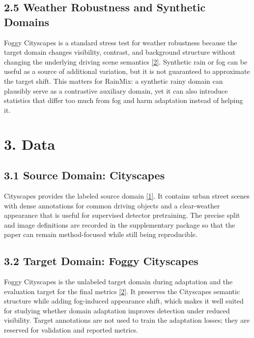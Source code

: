 \documentclass[
  11pt,
]{article}
\begin{document}
\hypertarget{weather-robustness-and-synthetic-domains}{%
\subsection{2.5 Weather Robustness and Synthetic
Domains}\label{weather-robustness-and-synthetic-domains}}

Foggy Cityscapes is a standard stress test for weather robustness
because the target domain changes visibility, contrast, and background
structure without changing the underlying driving scene semantics
\protect\hyperlink{ref-sakaridis2018semanticfoggy}{{[}2{]}}. Synthetic
rain or fog can be useful as a source of additional variation, but it is
not guaranteed to approximate the target shift. This matters for
RainMix: a synthetic rainy domain can plausibly serve as a contrastive
auxiliary domain, yet it can also introduce statistics that differ too
much from fog and harm adaptation instead of helping it.

\hypertarget{data}{%
\section{3. Data}\label{data}}

\hypertarget{source-domain-cityscapes}{%
\subsection{3.1 Source Domain:
Cityscapes}\label{source-domain-cityscapes}}

Cityscapes provides the labeled source domain
\protect\hyperlink{ref-cordts2016cityscapes}{{[}1{]}}. It contains urban
street scenes with dense annotations for common driving objects and a
clear-weather appearance that is useful for supervised detector
pretraining. The precise split and image definitions are recorded in the
supplementary package so that the paper can remain method-focused while
still being reproducible.

\hypertarget{target-domain-foggy-cityscapes}{%
\subsection{3.2 Target Domain: Foggy
Cityscapes}\label{target-domain-foggy-cityscapes}}

Foggy Cityscapes is the unlabeled target domain during adaptation and
the evaluation target for the final metrics
\protect\hyperlink{ref-sakaridis2018semanticfoggy}{{[}2{]}}. It
preserves the Cityscapes semantic structure while adding fog-induced
appearance shift, which makes it well suited for studying whether domain
adaptation improves detection under reduced visibility. Target
annotations are not used to train the adaptation losses; they are
reserved for validation and reported metrics.
\end{document}
